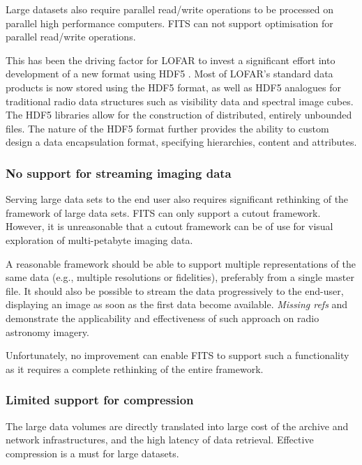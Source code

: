 \documentclass[final,authoryear,5p,times,twocolumn]{elsarticle}
\begin{document}
{{Large datasets also require parallel read/write operations to be processed on 
parallel high performance computers. FITS can not support optimisation for 
parallel read/write operations. 

This has been the driving factor for LOFAR to 
invest a significant effort into development of a new format using
HDF5  \citep{2012ASPC..461..283A}. Most of LOFAR's standard data products 
is now stored using the HDF5 format, as well as HDF5 analogues for traditional radio data 
structures such as visibility data and spectral image cubes. The HDF5 libraries allow 
for the construction of distributed, entirely unbounded files. The nature of the HDF5 
format further provides the ability to custom design a data encapsulation format, 
specifying hierarchies, content and attributes.

\subsubsection{No support for streaming imaging data}
\label{section_stream_image}

Serving large data sets to the end user also requires significant
rethinking of the framework of large data sets. FITS can only support a
cutout framework.  However, it is unreasonable that a cutout framework
can be of use for visual exploration of multi-petabyte imaging data.

A reasonable framework should be able to support multiple representations
of the same data (e.g., multiple resolutions or fidelities), preferably
from a single master file. It should also be possible to stream the data
progressively to the end-user, displaying an image as soon
as the first data become available. {\color{red} \textit{Missing refs} \citealt{2014arXiv1403.2801K} and 
\citealt{2014arXiv1401.7433P}}  demonstrate the applicability and effectiveness 
of such approach on radio astronomy imagery. 

Unfortunately, no improvement can enable FITS to support
such a functionality as it requires a complete rethinking of the entire framework.

\subsubsection{Limited support for compression}

The large data volumes are directly translated into large cost of the archive and 
network infrastructures, and the high latency of data retrieval. Effective 
compression is a must for large datasets.

}}
\end{document}
